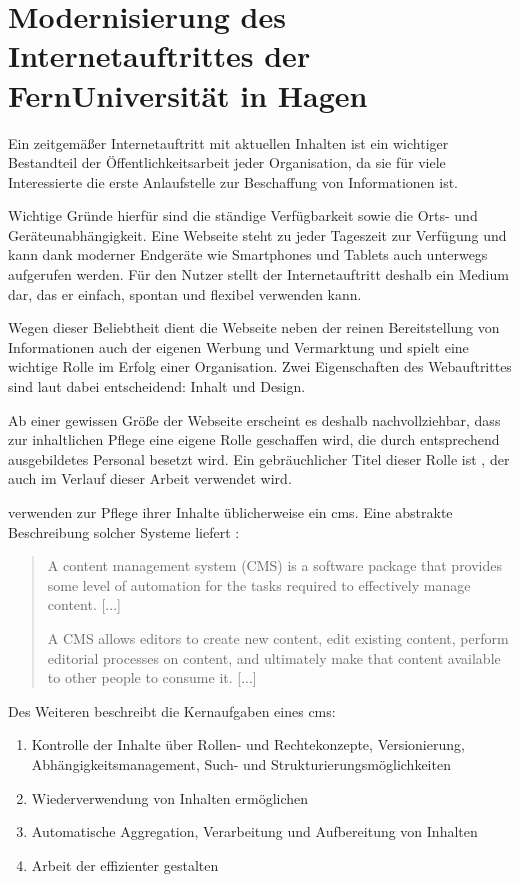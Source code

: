 \chapter{Modernisierung des Internetauftrittes der FernUniversität in Hagen}
    \label{chapter:FernUniRelaunch}
    Ein zeitgemäßer Internetauftritt mit aktuellen Inhalten
    ist ein wichtiger Bestandteil der Öffentlichkeitsarbeit jeder Organisation,
    da sie für viele Interessierte die erste Anlaufstelle zur Beschaffung von Informationen ist.
    
    Wichtige Gründe hierfür sind die ständige Verfügbarkeit sowie die Orts-
    und Geräteunabhängigkeit.
    Eine Webseite steht zu jeder Tageszeit zur Verfügung und kann
    dank moderner Endgeräte wie Smartphones und Tablets
    auch unterwegs aufgerufen werden.
    Für den Nutzer stellt der Internetauftritt deshalb ein Medium dar,
    das er einfach, spontan und flexibel verwenden kann.

    Wegen dieser Beliebtheit dient die Webseite neben der reinen Bereitstellung von Informationen
    auch der eigenen Werbung und Vermarktung und spielt eine wichtige Rolle im Erfolg einer Organisation.
    Zwei Eigenschaften des Webauftrittes sind laut \cite{sillence:onlineHealthSites} dabei
    entscheidend: Inhalt und Design.

    Ab einer gewissen Größe der Webseite erscheint es deshalb nachvollziehbar,
    dass zur inhaltlichen Pflege eine eigene Rolle geschaffen wird,
    die durch entsprechend ausgebildetes Personal besetzt wird.
    Ein gebräuchlicher Titel dieser Rolle ist \textit{\editor},
    der auch im Verlauf dieser Arbeit verwendet wird.

    \editors verwenden zur Pflege ihrer Inhalte üblicherweise ein \gls{cms}.
    Eine abstrakte Beschreibung solcher Systeme liefert \cite[][Seite 5,6]{barker:webCMS}:

    \begin{quote}
        A content management system (CMS) is a software package that provides
        some level of automation for the tasks required to effectively manage content.
        [...]

        A CMS allows editors to create new content, edit existing content,
        perform editorial processes on content, and ultimately make that content
        available to other people to consume it.
        [...]
    \end{quote}

    Des Weiteren beschreibt \cite[][Seite 9-12]{barker:webCMS} die Kernaufgaben eines \gls{cms}:
    \begin{enumerate}
        \item   Kontrolle der Inhalte über Rollen- und Rechtekonzepte,
                Versionierung, Abhängigkeitsmanagement, Such- und Strukturierungsmöglichkeiten
        \item   Wiederverwendung von Inhalten ermöglichen
        \item   Automatische Aggregation, Verarbeitung und Aufbereitung von Inhalten
        \item   Arbeit der \editors effizienter gestalten
    \end{enumerate}


